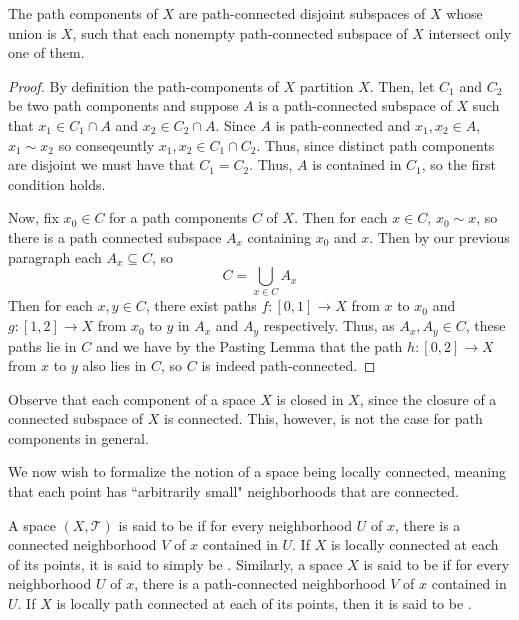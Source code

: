\documentclass[12pt, a4paper, oneside, openright, titlepage]{book}
\begin{document}
\begin{theorem}
    The path components of $X$ are path-connected disjoint subspaces of $X$ whose union is $X$, such that each nonempty path-connected subspace of $X$ intersect only one of them.
\end{theorem}
\begin{proof}
    By definition the path-components of $X$ partition $X$. Then, let $C_1$ and $C_2$ be two path components and suppose $A$ is a path-connected subspace of $X$ such that $x_1 \in C_1 \cap A$ and $x_2 \in C_2 \cap A$. Since $A$ is path-connected and $x_1, x_2 \in A$, $x_1 \sim x_2$ so conseqeuntly $x_1,x_2 \in C_1 \cap C_2$. Thus, since distinct path components are disjoint we must have that $C_1 = C_2$. Thus, $A$ is contained in $C_1$, so the first condition holds.

    Now, fix $x_0 \in C$ for a path components $C$ of $X$. Then for each $x \in C$, $x_0 \sim x$, so there is a path connected subspace $A_x$ containing $x_0$ and $x$. Then by our previous paragraph each $A_x \subseteq C$, so \begin{equation*}
        C =\bigcup\limits_{x\in C}A_x
    \end{equation*}
    Then for each $x,y \in C$, there exist paths $f:[0,1]\rightarrow X$ from $x$ to $x_0$ and $g:[1,2]\rightarrow X$ from $x_0$ to $y$ in $A_x$ and $A_y$ respectively. Thus, as $A_x,A_y \in C$, these paths lie in $C$ and we have by the Pasting Lemma that the path $h:[0,2]\rightarrow X$ from $x$ to $y$ also lies in $C$, so $C$ is indeed path-connected.
\end{proof}

Observe that each component of a space $X$ is closed in $X$, since the closure of a connected subspace of $X$ is connected. This, however, is not the case for path components in general.

We now wish to formalize the notion of a space being locally connected, meaning that each point has ``arbitrarily small" neighborhoods that are connected.

\begin{definition}
    A space $(X,\mathcal{T})$ is said to be  if for every neighborhood $U$ of $x$, there is a connected neighborhood $V$ of $x$ contained in $U$. If $X$ is locally connected at each of its points, it is said to simply be . Similarly, a space $X$ is said to be  if for every neighborhood $U$ of $x$, there is a path-connected neighborhood $V$ of $x$ contained in $U$. If $X$ is locally path connected at each of its points, then it is said to be .
\end{definition}
\end{document}
